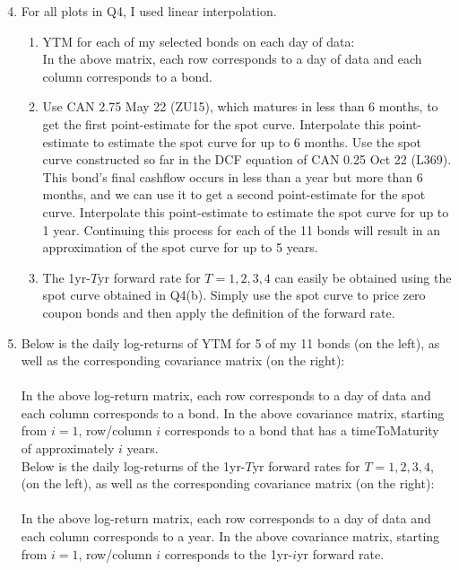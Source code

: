 \documentclass{article}
\begin{document}
	\begin{enumerate}
		\setcounter{enumi}{3} 
		\item For all plots in Q4, I used linear interpolation.\hfill
		\begin{enumerate}
			\item  YTM for each of my selected bonds on each day of data:\\ 	In the above matrix, each row corresponds to a day of data and each column corresponds to a bond.\\
			
			
			\item Use CAN 2.75 May 22 (ZU15), which matures in less than 6 months, to get the first point-estimate for the spot curve. Interpolate this point-estimate to estimate the spot curve for up to 6 months. Use the spot curve constructed so far in the DCF equation of CAN 0.25 Oct 22 (L369). This bond's final cashflow occurs in less than a year but more than 6 months, and we can use it to get a second point-estimate for the spot curve. Interpolate this point-estimate to estimate the spot curve for up to 1 year. Continuing this process for each of the 11 bonds will result in an approximation of the spot curve for up to 5 years. \\
			
			
			\item The 1yr-$T$yr forward rate for $T=1,2,3,4$ can easily be obtained using the spot curve obtained in Q4(b). Simply use the spot curve to price zero coupon bonds and then apply the definition of the forward rate.\\
			
		\end{enumerate}
		\item Below is the daily log-returns of YTM for 5 of my 11 bonds (on the left), as well as the corresponding covariance matrix (on the right):\\ \\ 	In the above log-return matrix, each row corresponds to a day of data and each column corresponds to a bond. In the above covariance matrix, starting from $i=1$, row/column $i$ corresponds to a bond that has a timeToMaturity of approximately $i$ years.\\
		
		Below is the daily log-returns of the 1yr-$T$yr forward rates for $T=1,2,3,4$, (on the left), as well as the corresponding covariance matrix (on the right):\\ \\ 	In the above log-return matrix, each row corresponds to a day of data and each column corresponds to a year. In the above covariance matrix, starting from $i=1$, row/column $i$ corresponds to the 1yr-$i$yr forward rate.
		

\end{enumerate}
\end{document}
